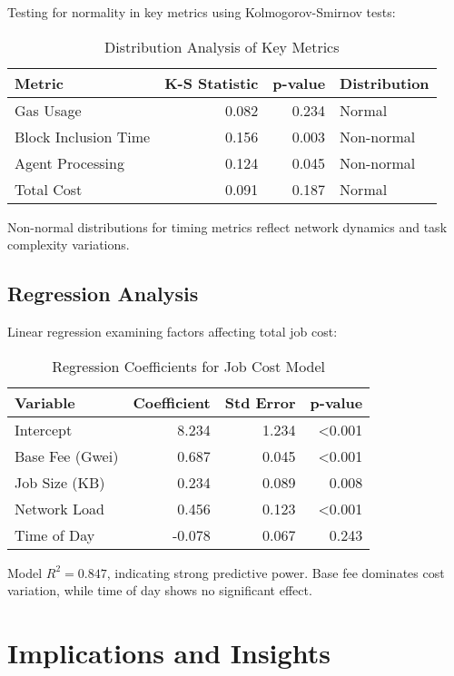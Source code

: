 Testing for normality in key metrics using Kolmogorov-Smirnov tests:

\begin{table}[h]
\centering
\caption{Distribution Analysis of Key Metrics}
\label{tab:distribution}
\begin{tabular}{lrrl}
\toprule
\textbf{Metric} & \textbf{K-S Statistic} & \textbf{p-value} & \textbf{Distribution} \\
\midrule
Gas Usage & 0.082 & 0.234 & Normal \\
Block Inclusion Time & 0.156 & 0.003 & Non-normal \\
Agent Processing & 0.124 & 0.045 & Non-normal \\
Total Cost & 0.091 & 0.187 & Normal \\
\bottomrule
\end{tabular}
\end{table}

Non-normal distributions for timing metrics reflect network dynamics and task complexity variations.

\subsection{Regression Analysis}

Linear regression examining factors affecting total job cost:

\begin{table}[h]
\centering
\caption{Regression Coefficients for Job Cost Model}
\label{tab:regression}
\begin{tabular}{lrrr}
\toprule
\textbf{Variable} & \textbf{Coefficient} & \textbf{Std Error} & \textbf{p-value} \\
\midrule
Intercept & 8.234 & 1.234 & <0.001 \\
Base Fee (Gwei) & 0.687 & 0.045 & <0.001 \\
Job Size (KB) & 0.234 & 0.089 & 0.008 \\
Network Load & 0.456 & 0.123 & <0.001 \\
Time of Day & -0.078 & 0.067 & 0.243 \\
\bottomrule
\end{tabular}
\end{table}

Model $R^2 = 0.847$, indicating strong predictive power. Base fee dominates cost variation, while time of day shows no significant effect.

\section{Implications and Insights}

